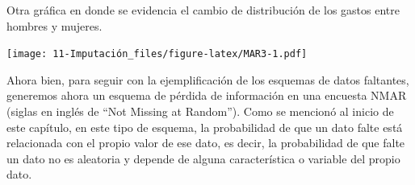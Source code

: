 \documentclass[
  12pt,
]{book}
\newenvironment{Shaded}{\begin{snugshade}}{\end{snugshade}}
\newcommand{\AttributeTok}[1]{\textcolor[rgb]{0.77,0.63,0.00}{#1}}
\newcommand{\FloatTok}[1]{\textcolor[rgb]{0.00,0.00,0.81}{#1}}
\newcommand{\FunctionTok}[1]{\textcolor[rgb]{0.00,0.00,0.00}{#1}}
\newcommand{\NormalTok}[1]{#1}
\newcommand{\OtherTok}[1]{\textcolor[rgb]{0.56,0.35,0.01}{#1}}
\newcommand{\SpecialCharTok}[1]{\textcolor[rgb]{0.00,0.00,0.00}{#1}}
\newcommand{\StringTok}[1]{\textcolor[rgb]{0.31,0.60,0.02}{#1}}
\begin{document}
Otra gráfica en donde se evidencia el cambio de distribución de los gastos entre hombres y mujeres.

\begin{Shaded}
\end{Shaded}

\texttt{[image: 11-Imputación\_files/figure-latex/MAR3-1.pdf]}

Ahora bien, para seguir con la ejemplificación de los esquemas de datos faltantes, generemos ahora un esquema de pérdida de información en una encuesta NMAR (siglas en inglés de ``Not Missing at Random''). Como se mencionó al inicio de este capítulo, en este tipo de esquema, la probabilidad de que un dato falte está relacionada con el propio valor de ese dato, es decir, la probabilidad de que falte un dato no es aleatoria y depende de alguna característica o variable del propio dato.
\end{document}
